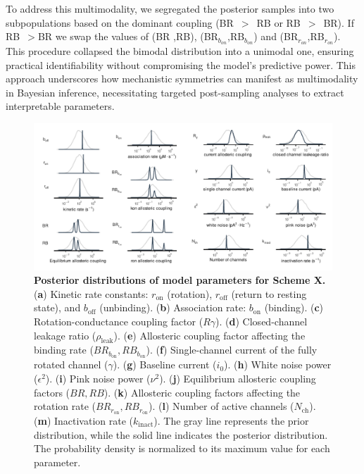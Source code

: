 \documentclass[pdflatex,sn-nature]{sn-jnl}%
\theoremstyle{thmstyleone}%
\theoremstyle{thmstyletwo}%
\theoremstyle{thmstylethree}%
\begin{document}
To address this multimodality, we segregated the posterior samples into two subpopulations based on the dominant coupling (BR~$>$~RB or RB~$>$~BR). If RB~$>$BR we swap the values of (BR ,RB), (BR$_{b_{on}}$,RB$_{b_{on}}$) and (BR$_{r_{on}}$,RB$_{r_{on}}$). This procedure collapsed the bimodal distribution into a unimodal one, ensuring practical identifiability without compromising the model's predictive power. This approach underscores how mechanistic symmetries can manifest as multimodality in Bayesian inference, necessitating targeted post-sampling analyses to extract interpretable parameters.


\begin{figure}[t]
	\centering
	\includegraphics[width=\linewidth]{Figure_2.pdf}
	\caption{\textbf{Posterior distributions of model parameters for Scheme X.}  
		(\textbf{a}) Kinetic rate constants: \(r_{\text{on}}\) (rotation), \(r_{\text{off}}\) (return to resting state), and \(b_{\text{off}}\) (unbinding).  
		(\textbf{b}) Association rate: \(b_{\text{on}}\) (binding).  
		(\textbf{c}) Rotation-conductance coupling factor (\(R\gamma\)).  
		(\textbf{d}) Closed-channel leakage ratio (\(\rho_{\text{leak}}\)).  
		(\textbf{e}) Allosteric coupling factor affecting the binding rate (\(BR_{b_{\text{on}}}, RB_{b_{\text{on}}}\)).  
		(\textbf{f}) Single-channel current of the fully rotated channel (\(\gamma\)).  
		(\textbf{g}) Baseline current (\(i_0\)).  
		(\textbf{h}) White noise power (\(\epsilon^2\)).  
		(\textbf{i}) Pink noise power (\(\nu^2\)).  
		(\textbf{j}) Equilibrium allosteric coupling factors (\(BR, RB\)).  
		(\textbf{k}) Allosteric coupling factors affecting the rotation rate (\(BR_{r_{\text{on}}}, RB_{r_{\text{on}}}\)).  
		(\textbf{l}) Number of active channels (\(N_{\text{ch}}\)).  
		(\textbf{m}) Inactivation rate (\(k_{\text{inact}}\)).  
		The gray line represents the prior distribution, while the solid line indicates the posterior distribution. The probability density is normalized to its maximum value for each parameter.
	}
	\label{fig:posterior_SchemeX}
\end{figure}
\end{document}
